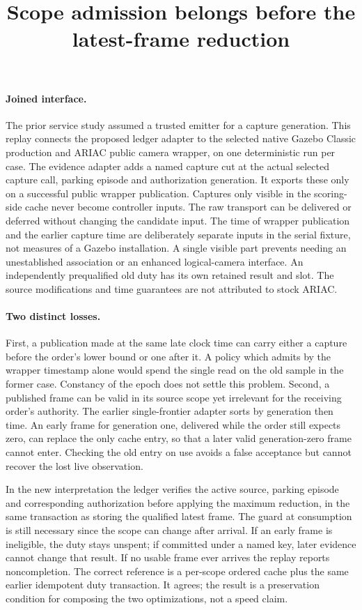 \documentclass{article}
\begin{document}
\title{Scope admission belongs before the latest-frame reduction}
\maketitle

\paragraph{Joined interface.}
The prior service study assumed a trusted emitter for a capture
generation. This replay connects the proposed ledger adapter to
the selected native Gazebo Classic production and ARIAC public
camera wrapper, on one deterministic run per case. The evidence
adapter adds a named capture cut at the actual selected capture
call, parking episode and authorization generation. It exports
these only on a successful public wrapper publication. Captures
only visible in the scoring-side cache never become controller
inputs. The raw transport can be delivered or deferred without
changing the candidate input. The time of wrapper publication
and the earlier capture time are deliberately separate inputs in
the serial fixture, not measures of a Gazebo installation.
A single visible part prevents needing an unestablished association
or an enhanced logical-camera interface. An independently
prequalified old duty has its own retained result and slot.
The source modifications and time guarantees are not attributed
to stock ARIAC.

\paragraph{Two distinct losses.}
First, a publication made at the same late clock time can carry
either a capture before the order's lower bound or one after it.
A policy which admits by the wrapper timestamp alone would spend
the single read on the old sample in the former case. Constancy of
the epoch does not settle this problem. Second, a published frame
can be valid in its source scope yet irrelevant for the receiving
order's authority. The earlier single-frontier adapter sorts by
generation then time. An early frame for generation one, delivered
while the order still expects zero, can replace the only cache
entry, so that a later valid generation-zero frame cannot enter.
Checking the old entry on use avoids a false acceptance but cannot
recover the lost live observation.

In the new interpretation the ledger verifies the active source,
parking episode and corresponding authorization before applying
the maximum reduction, in the same transaction as storing the
qualified latest frame. The guard at consumption is still necessary
since the scope can change after arrival. If an early frame is
ineligible, the duty stays unspent; if committed under a named key,
later evidence cannot change that result. If no usable frame ever
arrives the replay reports noncompletion. The correct reference is
a per-scope ordered cache plus the same earlier idempotent duty
transaction. It agrees; the result is a preservation condition for
composing the two optimizations, not a speed claim.
\end{document}
